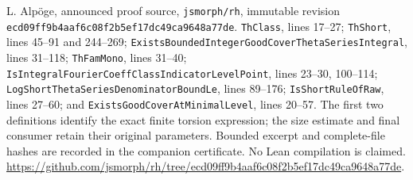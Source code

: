 L. Alp\"oge, announced proof source, \texttt{jsmorph/rh},
immutable revision \texttt{ecd09ff9b4aaf6c08f2b5ef17dc49ca9648a77de}.
\texttt{ThClass}, lines 17--27;
\texttt{ThShort}, lines 45--91 and 244--269;
\texttt{ExistsBoundedIntegerGoodCoverThetaSeriesIntegral}, lines 31--118;
\texttt{ThFamMono}, lines 31--40;
\texttt{IsIntegralFourierCoeffClassIndicatorLevelPoint}, lines 23--30,
100--114;
\texttt{LogShortThetaSeriesDenominatorBoundLe}, lines 89--176;
\texttt{IsShortRuleOfRaw}, lines 27--60;
and \texttt{ExistsGoodCoverAtMinimalLevel}, lines 20--57.
The first two definitions identify the exact finite torsion expression;
the size estimate and final consumer retain their original parameters.
Bounded excerpt and complete-file hashes are recorded in the companion
certificate.  No Lean compilation is claimed.
\url{https://github.com/jsmorph/rh/tree/ecd09ff9b4aaf6c08f2b5ef17dc49ca9648a77de}.
